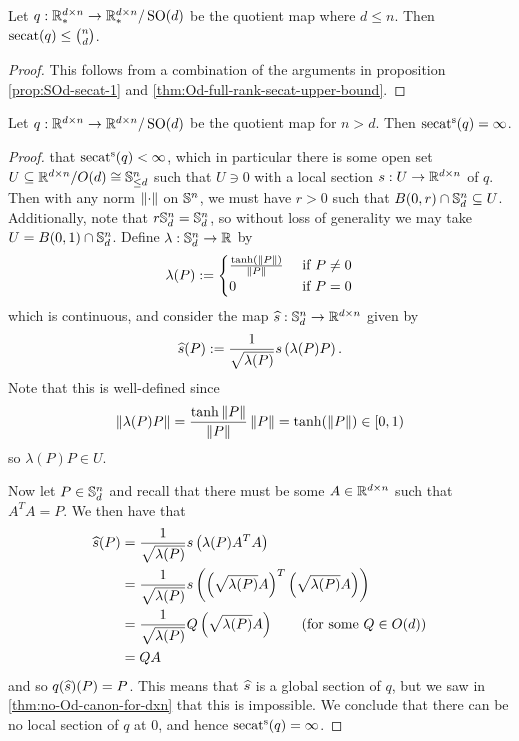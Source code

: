 \begin{theorem}\label{thm:SOd-full-rank-secat-upper-bound}
    Let $q : \R^{d \times n}_* \to \R^{d \times n}_* / \SO(d)$ be the quotient map where $d \leq n$.
    Then $\secat(q) \leq \binom{n}{d}$.
    \begin{proof}
        This follows from a combination of the arguments in proposition \ref{prop:SOd-secat-1} and \ref{thm:Od-full-rank-secat-upper-bound}.
    \end{proof}
\end{theorem}
    


\begin{theorem}\label{thm:no-local-Od-sections}
    Let $q : \R^{d \times n} \to \R^{d \times n}/\SO(d)$ be the quotient map for $n > d$.
    Then $\ssecat(q) = \infty$.
    \begin{proof}
        \Afsoc that $\ssecat(q) < \infty$, which in particular there is some open set $U \sub \R^{d \times n}/O(d) \cong \S^n_{\leq d}$ such that $U \ni 0$ with a local section $s : U \to \R^{d \times n}$ of $q$.
        Then with any norm $\norm{\cdot}$ on $\S^n$, we must have $r > 0$ such that $B(0,r) \cap \S^n_d \sub U$.
        Additionally, note that $r \S^n_d = \S^n_d$, so without loss of generality we may take $U = B(0,1) \cap \S^n_d$.
        Define $\lambda : \S^n_d \to \R$ by
        \[
            \lambda(P)
            :=
            \begin{cases}
                \f{\tanh(\norm{P})}{\norm{P}} &\tif P \neq 0 \\
                0 &\tif P = 0
            \end{cases}
        \]
        which is continuous, and consider the map $\Hat{s} : \S^n_d \to \R^{d \times n}$ given by
        \[
            \Hat{s}(P)
            := \f{1}{\sqrt{\lambda(P)}} s\bigp{\lambda(P) P}.
        \]
        Note that this is well-defined since
        \[
            \norm{\lambda(P) P}
            = \f{\tanh{\norm{P}}}{\norm{P}} \norm{P}
            = \tanh(\norm{P})
            \in [0,1)
        \]
        so $\lambda(P) P \in U$.

        Now let $P \in \S^n_d$ and recall that there must be some $A \in \R^{d \times n}$ such that $A^T A = P$.
        We then have that 
        \begin{align*}
            \Hat{s}(P)
            &= \f{1}{\sqrt{\lambda(P)}} s\bigp{\lambda(P) A^T A} \\
            &= \f{1}{\sqrt{\lambda(P)}} s\bigp{\bigp{\sqrt{\lambda(P)} A}^T \bigp{\sqrt{\lambda(P)} A}} \\
            &= \f{1}{\sqrt{\lambda(P)}} Q \bigp{\sqrt{\lambda(P)} A} \tag{for some $Q \in O(d)$} \\
            &= QA
        \end{align*}
        and so $q(\Hat{s})(P) = P$.
        This means that $\Hat{s}$ is a global section of $q$, but we saw in \ref{thm:no-Od-canon-for-dxn} that this is impossible.
        We conclude that there can be no local section of $q$ at $0$, and hence $\ssecat(q) = \infty$.
    \end{proof}
\end{theorem}

